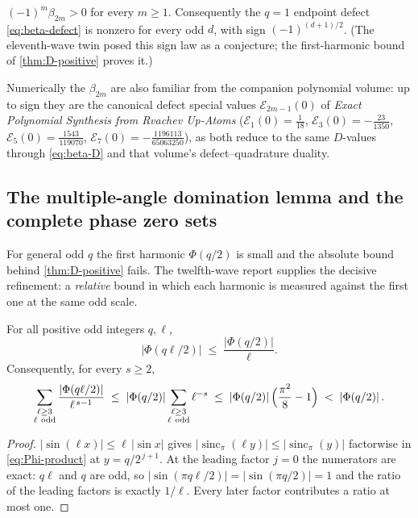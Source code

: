 \documentclass[11pt,oneside]{article}
\numberwithin{equation}{section}
\theoremstyle{definition}
\theoremstyle{remark}
\newcommand{\sincpi}{\operatorname{sinc}_{\pi}}
\newcommand{\abs}[1]{\left\lvert #1\right\rvert}
\begin{document}
\begin{corollary}
\label{cor:beta-sign}
$(-1)^{m}\beta_{2m}>0$ for every $m\ge1$.  Consequently the
$q=1$ endpoint defect \eqref{eq:beta-defect} is nonzero for every odd
$d$, with sign $(-1)^{(d+1)/2}$.  (The eleventh-wave twin posed this
sign law as a conjecture; the first-harmonic bound of
\cref{thm:D-positive} proves it.)
\end{corollary}

Numerically the $\beta_{2m}$ are also familiar from the companion
polynomial volume: up to sign they are the canonical defect special
values $\mathcal E_{2m-1}(0)$ of \emph{Exact Polynomial Synthesis
from Rvachev Up-Atoms}
($\mathcal E_1(0)=\tfrac1{18}$, $\mathcal E_3(0)=-\tfrac{23}{1350}$,
$\mathcal E_5(0)=\tfrac{1543}{119070}$,
$\mathcal E_7(0)=-\tfrac{1196113}{65063250}$), as both reduce to the
same $D$-values through \eqref{eq:beta-D} and that volume's
defect--quadrature duality.

\subsection{The multiple-angle domination lemma and the complete
phase zero sets}

For general odd $q$ the first harmonic $\Phi(q/2)$ is small and the
absolute bound behind \cref{thm:D-positive} fails.  The twelfth-wave
report supplies the decisive refinement: a \emph{relative} bound in
which each harmonic is measured against the first one at the same odd
scale.

\begin{lemma}
\label{lem:multiple-angle}
For all positive odd integers $q,\ell$,
\begin{equation}
 \boxed{\;
 \abs{\Phi(q\ell/2)}\;\le\;\frac{\abs{\Phi(q/2)}}{\ell}.\;}
 \label{eq:multiple-angle}
\end{equation}
Consequently, for every $s\ge2$,
\begin{equation}
 \sum_{\substack{\ell\ge3\\ \ell\ \mathrm{odd}}}
 \frac{\abs{\Phi(q\ell/2)}}{\ell^{\,s-1}}
 \;\le\;\abs{\Phi(q/2)}
 \sum_{\substack{\ell\ge3\\ \ell\ \mathrm{odd}}}\ell^{-s}
 \;\le\;\abs{\Phi(q/2)}\Bigl(\frac{\pi^{2}}8-1\Bigr)
 \;<\;\abs{\Phi(q/2)}.
 \label{eq:relative-dominance}
\end{equation}
\end{lemma}

\begin{proof}
$\abs{\sin(\ell x)}\le\ell\,\abs{\sin x}$ gives
$\abs{\sincpi(\ell y)}\le\abs{\sincpi(y)}$ factorwise in
\eqref{eq:Phi-product} at $y=q/2^{\,j+1}$.  At the leading factor
$j=0$ the numerators are exact: $q\ell$ and $q$ are odd, so
$\abs{\sin(\pi q\ell/2)}=\abs{\sin(\pi q/2)}=1$ and the ratio of the
leading factors is exactly $1/\ell$.  Every later factor contributes
a ratio at most one.
\end{proof}
\end{document}
